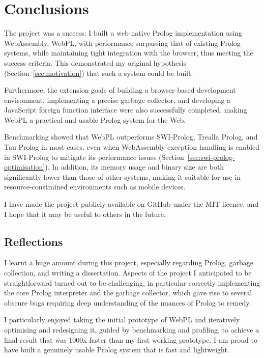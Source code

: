 \chapter{Conclusions}

The project was a success: I built a web-native Prolog implementation using WebAssembly, WebPL, with performance surpassing that of existing Prolog systems, while maintaining tight integration with the browser, thus meeting the success criteria. This demonstrated my original hypothesis (Section~\ref{sec:motivation}) that such a system could be built.

Furthermore, the extension goals of building a browser-based development environment, implementing a precise garbage collector, and developing a JavaScript foreign function interface were also successfully completed, making WebPL a practical and usable Prolog system for the Web.

Benchmarking showed that WebPL outperforms SWI-Prolog, Trealla Prolog, and Tau Prolog in most cases, even when WebAssembly exception handling is enabled in SWI-Prolog to mitigate its performance issues (Section~\ref{sec:swi-prolog-optimisation}). In addition, its memory usage and binary size are both significantly lower than those of other systems, making it suitable for use in resource-constrained environments such as mobile devices.

I have made the project publicly available on GitHub under the MIT licence, and I hope that it may be useful to others in the future.

\section{Reflections}

I learnt a huge amount during this project, especially regarding Prolog, garbage collection, and writing a dissertation. Aspects of the project I anticipated to be straightforward turned out to be challenging, in particular correctly implementing the core Prolog interpreter and the garbage collector, which gave rise to several obscure bugs requiring deep understanding of the nuances of Prolog to remedy.

I particularly enjoyed taking the initial prototype of WebPL and iteratively optimising and redesigning it, guided by benchmarking and profiling, to achieve a final result that was 1000x faster than my first working prototype. I am proud to have built a genuinely usable Prolog system that is fast and lightweight.

